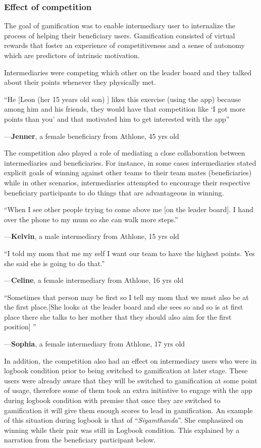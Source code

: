 \documentclass{sig-alternate}
\newenvironment{myquote}
               {\list{}{\rightmargin   \leftmargin
                        \parsep        0in }%
                \item\relax}
               {\endlist}
\newcommand{\userquote}[2]{\begin{samepage}\begin{myquote} 
     \em{\small{#2\begin{flushright}---#1\end{flushright}}}
   \end{myquote}\end{samepage}}
\begin{document}
\subsubsection*{\textbf{Effect of competition}}
The goal of gamification was to enable intermediary user to internalize the process of helping their beneficiary users. Gamification consisted of virtual rewards that foster an experience of competitiveness and a
sense of autonomy which are predictors of intrinsic motivation. 

Intermediaries were competing which other on the leader board and they talked about their points whenever they physically met.

\userquote{\textbf{Jenner}, a female beneficiary from Athlone, 45 yrs old} {``He [Leon (her 15 years old son) ] likes this exercise (using the app) because among him and his friends, they would have that competition like `I got more points than you' and that motivated him to get interested with the app''} 

The competition also played  a role of mediating a close collaboration between intermediaries and beneficiaries. For instance, in some cases intermediaries stated explicit goals of winning against other teams to their team mates (beneficiaries) while in other scenarios, intermediaries attempted to encourage their respective beneficiary participants to do things that are advantageous in winning.

\userquote{\textbf{Kelvin}, a male intermediary from Athlone, 15 yrs old} {``When I see other people trying to come above me [on the leader board]. I hand over the phone to my mum so she can walk more steps.''} 

\userquote{\textbf{Celine}, a female intermediary from Athlone, 16 yrs old} {``I told my mom that me my self I want our team to have the highest points. Yes she said she is going to do that.''} 

\userquote{\textbf{Sophia}, a female intermediary from Athlone, 17 yrs old} {``Sometimes that person may be first so I tell my mom that we must also be at the first place.[She looks at the  leader board and she sees so and so is at first place there she talks to her mother that they should also aim for the first position] ''} 

In addition, the competition also had an effect on intermediary users who were in logbook condition prior to being switched to gamification at later stage. These users were already aware that they will be switched to gamification at some point of usage, therefore some of them took an extra initiative to engage with the app during logbook condition with premise that once they are switched to gamification it will give them enough scores to lead in gamification. An example of this situation during logbook is that of ``\emph{Siyamthanda}''. She emphasized on winning while their pair was still in Logbook condition. This explained by a narration from the beneficiary participant below.
\end{document}
